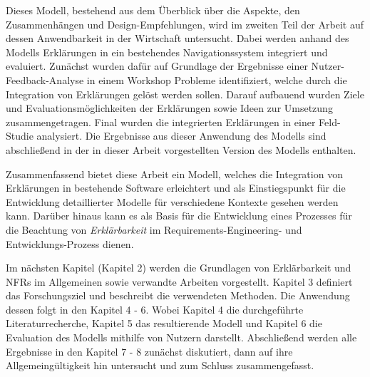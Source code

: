 Dieses Modell, bestehend aus dem Überblick über die Aspekte, den Zusammenhängen und Design-Empfehlungen, wird im zweiten Teil der Arbeit auf dessen Anwendbarkeit in der Wirtschaft untersucht. Dabei werden anhand des Modells Erklärungen in ein bestehendes Navigationssystem integriert und evaluiert. Zunächst wurden dafür auf Grundlage der Ergebnisse einer Nutzer-Feedback-Analyse in einem Workshop Probleme identifiziert, welche durch die Integration von Erklärungen gelöst werden sollen. Darauf aufbauend wurden Ziele und Evaluationsmöglichkeiten der Erklärungen sowie Ideen zur Umsetzung zusammengetragen. Final wurden die integrierten Erklärungen in einer Feld-Studie analysiert. Die Ergebnisse aus dieser Anwendung des Modells sind abschließend in der in dieser Arbeit vorgestellten Version des Modells enthalten.

Zusammenfassend bietet diese Arbeit ein Modell, welches die Integration von Erklärungen in bestehende Software erleichtert und als Einstiegspunkt für die Entwicklung detaillierter Modelle für verschiedene Kontexte gesehen werden kann. Darüber hinaus kann es als Basis für die Entwicklung eines Prozesses für die Beachtung von \textit{Erklärbarkeit} im Requirements-Engineering- und Entwicklungs-Prozess dienen.

Im nächsten Kapitel (Kapitel 2) werden die Grundlagen von Erklärbarkeit und NFRs im Allgemeinen sowie verwandte Arbeiten vorgestellt. Kapitel 3 definiert das Forschungsziel und beschreibt die verwendeten Methoden. Die Anwendung dessen folgt in den Kapitel 4 - 6. Wobei Kapitel 4 die durchgeführte Literaturrecherche, Kapitel 5 das resultierende Modell und Kapitel 6 die Evaluation des Modells mithilfe von Nutzern darstellt. Abschließend werden alle Ergebnisse in den Kapitel 7 - 8 zunächst diskutiert, dann auf ihre Allgemeingültigkeit hin untersucht und zum Schluss zusammengefasst.